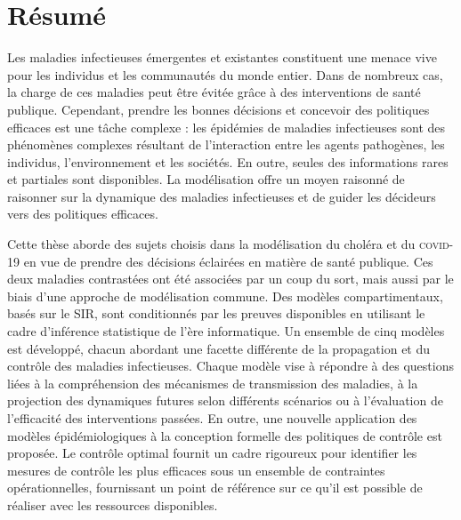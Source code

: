  \vspace{-.5cm}
 \chapter*{Résumé} 
\vspace{-.5cm}
 Les maladies infectieuses émergentes et existantes constituent une menace vive pour les individus et les communautés du monde entier. Dans de nombreux cas, la charge de ces maladies peut être évitée grâce à des interventions de santé publique. Cependant, prendre les bonnes décisions et concevoir des politiques efficaces est une tâche complexe : les épidémies de maladies infectieuses sont des phénomènes complexes résultant de l'interaction entre les agents pathogènes, les individus, l'environnement et les sociétés. En outre, seules des informations rares et partiales sont disponibles. La modélisation offre un moyen raisonné de raisonner sur la dynamique des maladies infectieuses et de guider les décideurs vers des politiques efficaces. 

Cette thèse aborde des sujets choisis dans la modélisation du choléra et du \textsc{covid}-19 en vue de prendre des décisions éclairées en matière de santé publique. Ces deux maladies contrastées ont été associées par un coup du sort, mais aussi par le biais d'une approche de modélisation commune.  Des modèles compartimentaux, basés sur le SIR, sont conditionnés par les preuves disponibles en utilisant le cadre d'inférence statistique de l'ère informatique. Un ensemble de cinq modèles est développé, chacun abordant une facette différente de la propagation et du contrôle des maladies infectieuses. Chaque modèle vise à répondre à des questions liées à la compréhension des mécanismes de transmission des maladies, à la projection des dynamiques futures selon différents scénarios ou à l'évaluation de l'efficacité des interventions passées. En outre, une nouvelle application des modèles épidémiologiques à la conception formelle des politiques de contrôle est proposée. Le contrôle optimal fournit un cadre rigoureux pour identifier les mesures de contrôle les plus efficaces sous un ensemble de contraintes opérationnelles, fournissant un point de référence sur ce qu'il est possible de réaliser avec les ressources disponibles.

